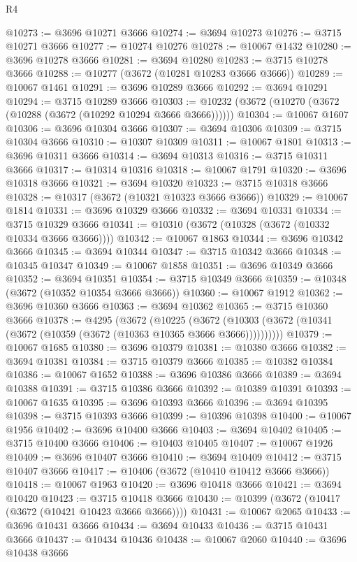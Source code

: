 \begin{lexlean}{R4}
\begin{coremodule}
@10273 := @3696 @10271 @3666
@10274 := @3694 @10273
@10276 := @3715 @10271 @3666
@10277 := @10274 @10276
@10278 := @10067 @1432
@10280 := @3696 @10278 @3666
@10281 := @3694 @10280
@10283 := @3715 @10278 @3666
@10288 := @10277 (@3672 (@10281 @10283 @3666 @3666))
@10289 := @10067 @1461
@10291 := @3696 @10289 @3666
@10292 := @3694 @10291
@10294 := @3715 @10289 @3666
@10303 := @10232 (@3672 (@10270 (@3672 (@10288 (@3672 (@10292 @10294 @3666 @3666))))))
@10304 := @10067 @1607
@10306 := @3696 @10304 @3666
@10307 := @3694 @10306
@10309 := @3715 @10304 @3666
@10310 := @10307 @10309
@10311 := @10067 @1801
@10313 := @3696 @10311 @3666
@10314 := @3694 @10313
@10316 := @3715 @10311 @3666
@10317 := @10314 @10316
@10318 := @10067 @1791
@10320 := @3696 @10318 @3666
@10321 := @3694 @10320
@10323 := @3715 @10318 @3666
@10328 := @10317 (@3672 (@10321 @10323 @3666 @3666))
@10329 := @10067 @1814
@10331 := @3696 @10329 @3666
@10332 := @3694 @10331
@10334 := @3715 @10329 @3666
@10341 := @10310 (@3672 (@10328 (@3672 (@10332 @10334 @3666 @3666))))
@10342 := @10067 @1863
@10344 := @3696 @10342 @3666
@10345 := @3694 @10344
@10347 := @3715 @10342 @3666
@10348 := @10345 @10347
@10349 := @10067 @1858
@10351 := @3696 @10349 @3666
@10352 := @3694 @10351
@10354 := @3715 @10349 @3666
@10359 := @10348 (@3672 (@10352 @10354 @3666 @3666))
@10360 := @10067 @1912
@10362 := @3696 @10360 @3666
@10363 := @3694 @10362
@10365 := @3715 @10360 @3666
@10378 := @4295
    (@3672
      (@10225
        (@3672 (@10303 (@3672 (@10341 (@3672 (@10359 (@3672 (@10363 @10365 @3666 @3666))))))))))
@10379 := @10067 @1685
@10380 := @3696 @10379
@10381 := @10380 @3666
@10382 := @3694 @10381
@10384 := @3715 @10379 @3666
@10385 := @10382 @10384
@10386 := @10067 @1652
@10388 := @3696 @10386 @3666
@10389 := @3694 @10388
@10391 := @3715 @10386 @3666
@10392 := @10389 @10391
@10393 := @10067 @1635
@10395 := @3696 @10393 @3666
@10396 := @3694 @10395
@10398 := @3715 @10393 @3666
@10399 := @10396 @10398
@10400 := @10067 @1956
@10402 := @3696 @10400 @3666
@10403 := @3694 @10402
@10405 := @3715 @10400 @3666
@10406 := @10403 @10405
@10407 := @10067 @1926
@10409 := @3696 @10407 @3666
@10410 := @3694 @10409
@10412 := @3715 @10407 @3666
@10417 := @10406 (@3672 (@10410 @10412 @3666 @3666))
@10418 := @10067 @1963
@10420 := @3696 @10418 @3666
@10421 := @3694 @10420
@10423 := @3715 @10418 @3666
@10430 := @10399 (@3672 (@10417 (@3672 (@10421 @10423 @3666 @3666))))
@10431 := @10067 @2065
@10433 := @3696 @10431 @3666
@10434 := @3694 @10433
@10436 := @3715 @10431 @3666
@10437 := @10434 @10436
@10438 := @10067 @2060
@10440 := @3696 @10438 @3666

\end{coremodule}
\end{lexlean}
